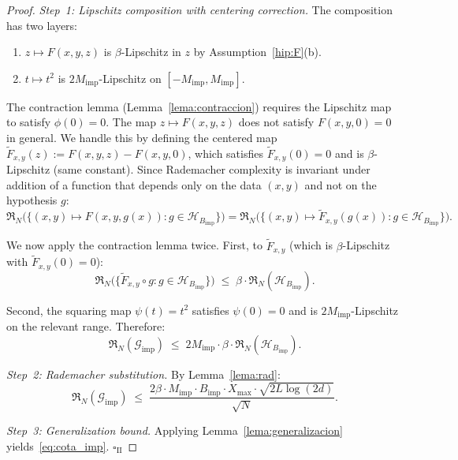 \documentclass[12pt]{article}
\newcommand{\Rad}{\mathfrak{R}}
\begin{document}
\begin{proof}
\emph{Step~1: Lipschitz composition with centering correction.}
The composition has two layers:
\begin{enumerate}[label=(\roman*)]
  \item $z \mapsto F(x,y,z)$ is $\beta$-Lipschitz in $z$ by
    Assumption~\ref{hip:F}(b).
  \item $t \mapsto t^2$ is $2M_{\mathrm{imp}}$-Lipschitz on
    $[-M_{\mathrm{imp}}, M_{\mathrm{imp}}]$.
\end{enumerate}

The contraction lemma (Lemma~\ref{lema:contraccion}) requires the
Lipschitz map to satisfy $\phi(0) = 0$.
The map $z \mapsto F(x,y,z)$ does not satisfy $F(x,y,0) = 0$ in
general.
We handle this by defining the centered map
$\tilde{F}_{x,y}(z) := F(x,y,z) - F(x,y,0)$, which satisfies
$\tilde{F}_{x,y}(0) = 0$ and is $\beta$-Lipschitz (same constant).
Since Rademacher complexity is invariant under addition of a function
that depends only on the data $(x,y)$ and not on the hypothesis $g$:
\begin{equation}
  \Rad_N\bigl(\{(x,y) \mapsto F(x,y,g(x))
    : g \in \mathcal{H}_{B_{\mathrm{imp}}}\}\bigr)
  = \Rad_N\bigl(\{(x,y) \mapsto \tilde{F}_{x,y}(g(x))
    : g \in \mathcal{H}_{B_{\mathrm{imp}}}\}\bigr).
\end{equation}

We now apply the contraction lemma twice.
First, to $\tilde{F}_{x,y}$ (which is $\beta$-Lipschitz with
$\tilde{F}_{x,y}(0) = 0$):
\begin{equation}
  \Rad_N\bigl(\{\tilde{F}_{x,y} \circ g
    : g \in \mathcal{H}_{B_{\mathrm{imp}}}\}\bigr)
  \;\le\; \beta \cdot \Rad_N(\mathcal{H}_{B_{\mathrm{imp}}}).
\end{equation}

Second, the squaring map $\psi(t) = t^2$ satisfies $\psi(0) = 0$
and is $2M_{\mathrm{imp}}$-Lipschitz on the relevant range.
Therefore:
\begin{equation}
  \Rad_N(\mathcal{G}_{\mathrm{imp}})
  \;\le\; 2M_{\mathrm{imp}} \cdot \beta \cdot
  \Rad_N(\mathcal{H}_{B_{\mathrm{imp}}}).
  \label{eq:rad_imp}
\end{equation}

\emph{Step~2: Rademacher substitution.}
By Lemma~\ref{lema:rad}:
\begin{equation}
  \Rad_N(\mathcal{G}_{\mathrm{imp}})
  \;\le\; \frac{2 \beta \cdot M_{\mathrm{imp}} \cdot
    B_{\mathrm{imp}} \cdot X_{\max} \cdot
    \sqrt{2L\log(2d)}}{\sqrt{N}}.
\end{equation}

\emph{Step~3: Generalization bound.}
Applying Lemma~\ref{lema:generalizacion}
yields~\eqref{eq:cota_imp}.
\hfill $\square_{\mathrm{II}}$
\end{proof}
\end{document}
